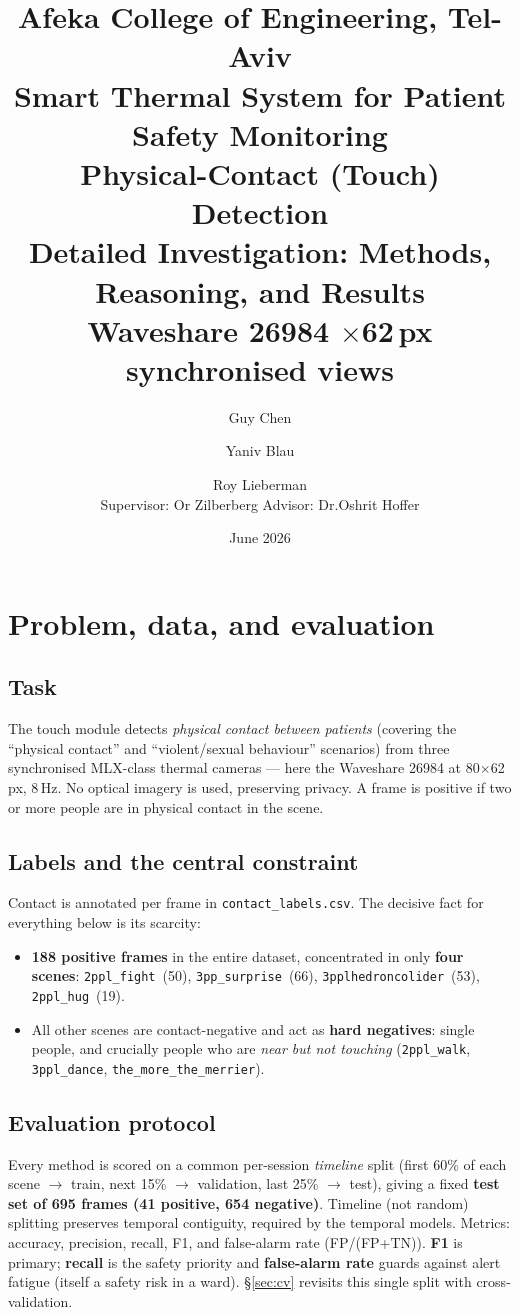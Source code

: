 \documentclass[11pt, a4paper]{article}
\title{%
    {\large Afeka College of Engineering, Tel-Aviv}\\[0.3em]
    {\large Smart Thermal System for Patient Safety Monitoring}\\[0.7em]
    {\LARGE\bfseries Physical-Contact (Touch) Detection}\\[0.2em]
    {\large Detailed Investigation: Methods, Reasoning, and Results}\\[0.3em]
    {\normalsize Waveshare 26984 \quad 80$\times$62\,px \quad 3 synchronised views}}
\author{Guy Chen \and Yaniv Blau \and Roy Lieberman\\[0.2em]
    \small Supervisor: Or Zilberberg \qquad Advisor: Dr.\@ Oshrit Hoffer}
\date{June 2026}
\begin{document}
\maketitle
\tableofcontents
\newpage

\section{Problem, data, and evaluation}

\subsection{Task}
The touch module detects \emph{physical contact between patients} (covering the
``physical contact'' and ``violent/sexual behaviour'' scenarios) from three
synchronised MLX-class thermal cameras --- here the Waveshare 26984 at
80$\times$62\,px, 8\,Hz. No optical imagery is used, preserving privacy. A frame
is positive if two or more people are in physical contact in the scene.

\subsection{Labels and the central constraint}
Contact is annotated per frame in \texttt{contact\_labels.csv}. The decisive
fact for everything below is its scarcity:
\begin{itemize}[leftmargin=1.4em, itemsep=1pt]
\item \textbf{188 positive frames} in the entire dataset, concentrated in only
      \textbf{four scenes}: \texttt{2ppl\_fight}~(50), \texttt{3pp\_surprise}~(66),
      \texttt{3pplhedroncolider}~(53), \texttt{2ppl\_hug}~(19).
\item All other scenes are contact-negative and act as \textbf{hard negatives}:
      single people, and crucially people who are \emph{near but not touching}
      (\texttt{2ppl\_walk}, \texttt{3ppl\_dance}, \texttt{the\_more\_the\_merrier}).
\end{itemize}

\subsection{Evaluation protocol}
Every method is scored on a common per-session \emph{timeline} split (first 60\%
of each scene $\to$ train, next 15\% $\to$ validation, last 25\% $\to$ test),
giving a fixed \textbf{test set of 695 frames (41 positive, 654 negative)}.
Timeline (not random) splitting preserves temporal contiguity, required by the
temporal models. Metrics: accuracy, precision, recall, F1, and false-alarm rate
(FP/(FP+TN)). \textbf{F1} is primary; \textbf{recall} is the safety priority and
\textbf{false-alarm rate} guards against alert fatigue (itself a safety risk in a
ward). §\ref{sec:cv} revisits this single split with cross-validation.
\end{document}
